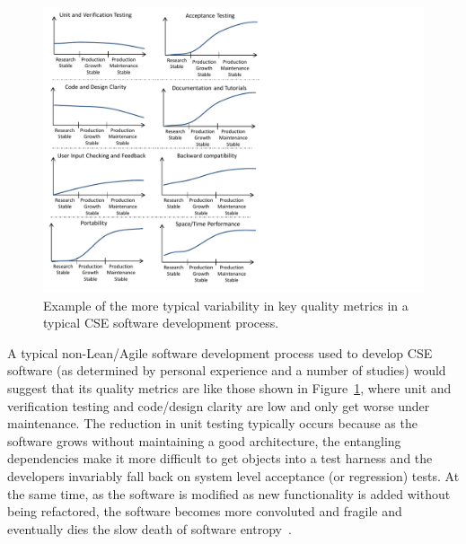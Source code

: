 \documentclass[11pt]{SANDreport}
\begin{document}
\begin{figure}
\begin{center}
\includegraphics[trim = 0.1in 0.1in 4.0in 0.1in, scale=0.85]
{TypicalNonAgileSoftwarePhases}
{}\caption{Example of the more typical variability in key quality
metrics in a typical CSE software development process.}
\label{fig:TypicalNonAgileSoftwarePhases}
\end{center}
\end{figure}

A typical non-Lean/Agile software development process used to develop
CSE software (as determined by personal experience and a number of
studies) would suggest that its quality metrics are like those shown
in Figure~\ref{fig:TypicalNonAgileSoftwarePhases}, where unit and
verification testing and code/design clarity are low and only get
worse under maintenance.  The reduction in unit testing typically
occurs because as the software grows without maintaining a good
architecture, the entangling dependencies make it more
difficult to get objects into a test harness and the developers
invariably fall back on system level acceptance (or regression) tests.
At the same time, as the software is modified as new functionality is
added without being refactored, the software becomes more convoluted
and fragile and eventually dies the slow death of software
entropy~\cite{MythicalManMonth95}.
\end{document}

